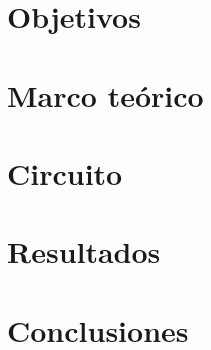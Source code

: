 \documentclass[12pt,a4paper]{article}
\begin{document}
\tableofcontents
\newpage

\section{Objetivos}

\section{Marco teórico}

\section{Circuito}

\section{Resultados}

\section{Conclusiones}

\end{document}
